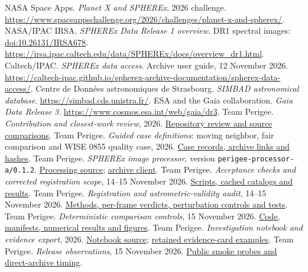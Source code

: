 \documentclass[11pt,letterpaper]{article}
\newcommand{\repo}[2]{\href{https://github.com/sathvikloke/perigee/#1}{#2}}
\begin{document}
\begin{thebibliography}{99}
\small
\setlength{\itemsep}{5pt}
 NASA Space Apps. \emph{Planet X and SPHEREx}, 2026 challenge. \url{https://www.spaceappschallenge.org/2026/challenges/planet-x-and-spherex/}.
 NASA/IPAC IRSA. \emph{SPHEREx Data Release 1 overview}. DR1 spectral images: \href{https://doi.org/10.26131/IRSA678}{doi:10.26131/IRSA678}. \url{https://irsa.ipac.caltech.edu/data/SPHEREx/docs/overview_dr1.html}.
 Caltech/IPAC. \emph{SPHEREx data access}. Archive user guide, 12 November 2026. \url{https://caltech-ipac.github.io/spherex-archive-documentation/spherex-data-access/}.
 Centre de Donn\'ees astronomiques de Strasbourg. \emph{SIMBAD astronomical database}. \url{https://simbad.cds.unistra.fr/}.
 ESA and the Gaia collaboration. \emph{Gaia Data Release 3}. \url{https://www.cosmos.esa.int/web/gaia/dr3}.
 Team Perigee. \emph{Contribution and closest-work review}, 2026. \repo{blob/main/science/reviews/contribution/README.md}{Repository review and source comparisons}.
 Team Perigee. \emph{Guided case definitions}: moving neighbor, fair comparison and WISE 0855 quality case, 2026. \repo{tree/main/backend/content/cases}{Case records, archive links and hashes}.
 Team Perigee. \emph{SPHEREx image processor}, version \texttt{perigee-processor-a/0.1.2}. \repo{blob/main/backend/data/process.py}{Processing source}; \repo{blob/main/backend/data/archive.py}{archive client}.
 Team Perigee. \emph{Acceptance checks and corrected registration scope}, 14--15 November 2026. \repo{tree/main/science/reviews/acceptance}{Scripts, cached catalogs and results}.
 Team Perigee. \emph{Registration and astrometric-validity audit}, 14--15 November 2026. \repo{tree/main/science/reviews/registration-audit}{Methods, per-frame verdicts, perturbation controls and tests}.
 Team Perigee. \emph{Deterministic comparison controls}, 15 November 2026. \repo{tree/main/science/reviews/overnight-controls}{Code, manifests, numerical results and figures}.
 Team Perigee. \emph{Investigation notebook and evidence export}, 2026. \repo{blob/main/frontend/src/components/Notebook.tsx}{Notebook source}; \repo{tree/main/docs/presentation/rehearsal}{retained evidence-card examples}.
 Team Perigee. \emph{Release observations}, 15 November 2026. \repo{blob/main/qa/landing-motion/RELEASE.md}{Public smoke probes and direct-archive timing}.
\end{thebibliography}
\end{document}
